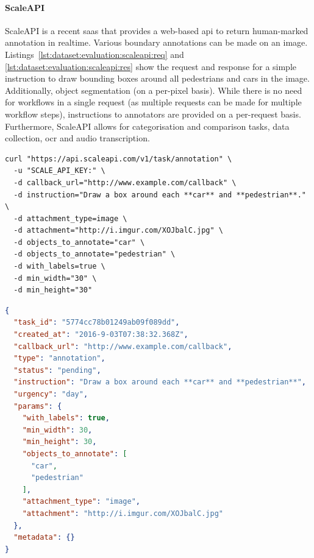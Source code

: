 
\paragraph{ScaleAPI}

ScaleAPI is a recent \gls{saas} that provides a web-based \gls{api} to return human-marked annotation in realtime. Various boundary annotations can be made on an image. Listings~\ref{lst:dataset:evaluation:scaleapi:req} and \ref{lst:dataset:evaluation:scaleapi:res} show the request and response for a simple instruction to draw bounding boxes around all pedestrians and cars in the image. Additionally, object segmentation (on a per-pixel basis). While there is no need for workflows in a single request (as multiple requests can be made for multiple workflow steps), instructions to annotators are provided on a per-request basis. Furthermore, ScaleAPI allows for categorisation and comparison tasks, data collection, \gls{ocr} and audio transcription.

\begin{lstlisting}[language=CURL, label=lst:dataset:evaluation:scaleapi:req, caption={[Sample ScaleAPI request] A sample ScaleAPI HTTP request made using cURL\footnotemark.}]
curl "https://api.scaleapi.com/v1/task/annotation" \
  -u "SCALE_API_KEY:" \
  -d callback_url="http://www.example.com/callback" \
  -d instruction="Draw a box around each **car** and **pedestrian**." \
  -d attachment_type=image \
  -d attachment="http://i.imgur.com/XOJbalC.jpg" \
  -d objects_to_annotate="car" \
  -d objects_to_annotate="pedestrian" \
  -d with_labels=true \
  -d min_width="30" \
  -d min_height="30"  
\end{lstlisting}

\begin{lstlisting}[language=JSON, label=lst:dataset:evaluation:scaleapi:res, caption={[Sample ScaleAPI response] Sample \glsac{json} response from the request made in Listing~\ref{lst:dataset:evaluation:scaleapi:req}.}]
{
  "task_id": "5774cc78b01249ab09f089dd",
  "created_at": "2016-9-03T07:38:32.368Z",
  "callback_url": "http://www.example.com/callback",
  "type": "annotation",
  "status": "pending",
  "instruction": "Draw a box around each **car** and **pedestrian**",
  "urgency": "day",
  "params": {
    "with_labels": true,
    "min_width": 30,
    "min_height": 30,
    "objects_to_annotate": [
      "car",
      "pedestrian"
    ],
    "attachment_type": "image",
    "attachment": "http://i.imgur.com/XOJbalC.jpg"
  },
  "metadata": {}
}
\end{lstlisting}
\clearpage

